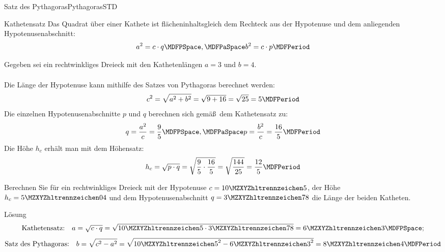 \begin{MXContent}{Satz des Pythagoras}{Pythagoras}{STD}
\begin{MCOSHZusatz}
\begin{MXInfo}{Kathetensatz}
Das Quadrat \"uber einer Kathete ist fl\"acheninhaltsgleich dem Rechteck aus 
der Hypotenuse und dem anliegenden Hypotenusenabschnitt: 
\[a^2 = c\cdot q \MDFPSpace, \MDFPaSpace b^2=c\cdot p \MDFPeriod\]
\end{MXInfo}

\begin{MExample}
Gegeben sei ein rechtwinkliges Dreieck mit den Kathetenl\"angen $a=3$ und 
$b=4$.\\
\ \\
Die L\"ange der Hypotenuse kann mithilfe des Satzes von Pythagoras berechnet 
werden:
\[c^2=\sqrt{a^2 + b^2}=\sqrt{9 + 16}=\sqrt{25}=5 \MDFPeriod\]
Die einzelnen Hypotenusenabschnitte $p$ und $q$ berechnen sich gem\"a\ss\ dem Kathetensatz zu:
\[q=\frac{a^2}{c}=\frac{9}{5} \MDFPSpace, \MDFPaSpace p=\frac{b^2}{c}=\frac{16}{5} \MDFPeriod\]
Die H\"ohe $h_c$ erh\"alt man mit dem H\"ohensatz:
\[h_c=\sqrt{p\cdot q}=\sqrt{\frac{9}{5}\cdot\frac{16}{5}}=\sqrt{\frac{144}{25}}=\frac{12}{5} \MDFPeriod\]
\end{MExample}

\begin{MExercise}
Berechnen Sie f\"ur ein rechtwinkliges Dreieck mit der Hypotenuse $c=\MZahl{10}{5}$, der H\"ohe $h_c=\MZahl{5}{04}$ und dem Hypotenusenabschnitt $q=\MZahl{3}{78}$ die L\"ange der beiden Katheten.

\begin{MHint}{L\"osung}
\[\text{Kathetensatz:} \quad a=\sqrt{c\cdot q}=\sqrt{\MZahl{10}{5} \cdot \MZahl{3}{78}}=\MZahl{6}{3} \MDFPSpace;\]
\[\text{Satz des Pythagoras:} \quad b=\sqrt{c^2-a^2} = \sqrt{{\MZahl{10}{5}}^2-{\MZahl{6}{3}}^2}=\MZahl{8}{4} \MDFPeriod\]
\end{MHint}
\end{MExercise}
\end{MCOSHZusatz}

\end{MXContent}


